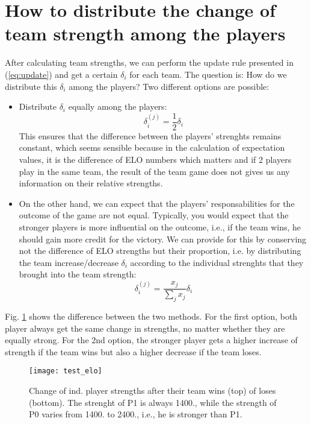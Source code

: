 \documentclass[a4paper,10pt]{article}
\begin{document}
\section{How to distribute the change of team strength among the players}
After calculating team strengths, we can perform the update rule presented in (\ref{eq:update}) and get a certain $\delta_i$ for each team.
The question is: How do we distribute this $\delta_i$ among the players? Two different options are possible:
\begin{itemize}
\item Distribute $\delta_i$ equally among the players:
  \begin{equation}
    \delta_i^{(j)} = \frac{1}{2} \delta_i
  \end{equation}
This ensures that the difference between the players' strenghts remains constant, which seems sensible because in the calculation of expectation values, it is the difference of ELO numbers which matters and if 2 players play in the same team, the result of the team game does not gives us any information on their relative strengths.
\item On the other hand, we can expect that the players' responsabilities for the outcome of the game are not equal. Typically, you would expect that the stronger players is more influential on the outcome, i.e., if the team wins, he should gain more credit for the victory. We can provide for this by conserving not the difference of ELO strengths but their proportion, i.e. by distributing the team increase/decrease $\delta_i$ according to the individual strenghts that they brought into the team strength:
  \begin{equation}
    \delta_i^{(j)} = \frac{x_j}{\sum_j x_j} \delta_i
  \end{equation}
\end{itemize}

Fig. \ref{fig:test_elo} shows the difference between the two methods. For the first option, both player always get the same change in strengths, no matter whether they are equally strong. For the 2nd option, the stronger player gets a higher increase of strength if the team wins but also a higher decrease if the team loses.

\begin{figure}
\texttt{[image: test\_elo]}
    \caption{Change of ind. player strengths after their team wins (top) of loses (bottom). The strenght of P1 is always 1400., while the strength of P0 varies from 1400. to 2400., i.e., he is stronger than P1.}
  \label{fig:test_elo}
\end{figure}
\end{document}
